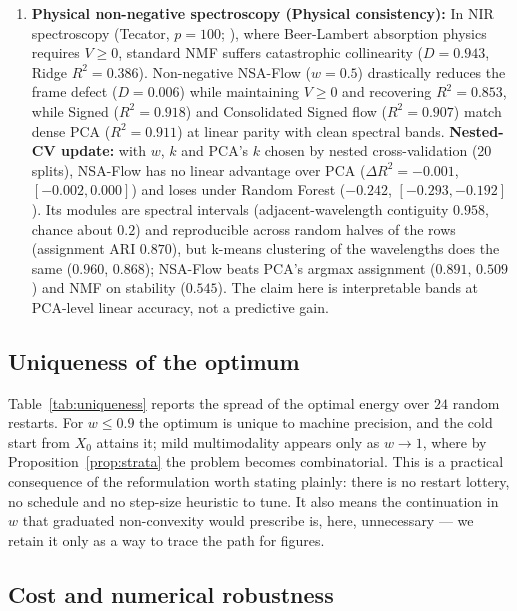 \documentclass[11pt]{article}
\theoremstyle{definition}
\begin{document}
\begin{enumerate}
  \item \textbf{Physical non-negative spectroscopy (Physical consistency):} In NIR spectroscopy (Tecator, $p=100$; \citealt{borggaard1992optimal}), where Beer-Lambert absorption physics requires $V \ge 0$, standard NMF suffers catastrophic collinearity ($D = 0.943$, Ridge $R^2 = 0.386$). Non-negative NSA-Flow ($w=0.5$) drastically reduces the frame defect ($D = 0.006$) while maintaining $V \ge 0$ and recovering $R^2 = 0.853$, while Signed ($R^2 = 0.918$) and Consolidated Signed flow ($R^2 = 0.907$) match dense PCA ($R^2 = 0.911$) at linear parity with clean spectral bands. \textbf{Nested-CV update:} with $w$, $k$ and PCA's $k$ chosen by nested cross-validation (20 splits), NSA-Flow has no linear advantage over PCA ($\Delta R^2=-0.001$, $[-0.002, 0.000]$) and loses under Random Forest ($-0.242$, $[-0.293,-0.192]$). Its modules are spectral intervals (adjacent-wavelength contiguity $0.958$, chance about $0.2$) and reproducible across random halves of the rows (assignment ARI $0.870$), but k-means clustering of the wavelengths does the same ($0.960$, $0.868$); NSA-Flow beats PCA's argmax assignment ($0.891$, $0.509$) and NMF on stability ($0.545$). The claim here is interpretable bands at PCA-level linear accuracy, not a predictive gain.
\end{enumerate}

\subsection{Uniqueness of the optimum}\label{sec:exp-uniqueness}

Table~\ref{tab:uniqueness} reports the spread of the optimal energy over $24$
random restarts. For $w \le 0.9$ the optimum is unique to machine precision, and
the cold start from $X_0$ attains it; mild multimodality appears only as
$w\to1$, where by Proposition~\ref{prop:strata} the problem becomes
combinatorial. This is a practical consequence of the reformulation worth
stating plainly: there is no restart lottery, no schedule and no step-size
heuristic to tune. It also means the continuation in $w$ that graduated
non-convexity would prescribe is, here, unnecessary --- we retain it only as a
way to trace the path for figures.



\subsection{Cost and numerical robustness}
\end{document}
